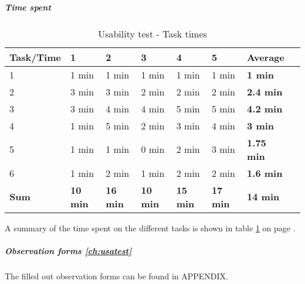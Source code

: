 \subparagraph{Time spent}\hfill
\newline
\begin{table}[h!]
\begin{center}
\begin{tabular}{l|l|l|l|l|l|l|l}	\hline
\textbf{Task/Time}&\textbf{1}&\textbf{2}&\textbf{3}&\textbf{4}&\textbf{5}&\textbf{Average}\\ \hline \hline
				1&1 min&1 min&1 min&1 min&1 min&\textbf{1 min}\\ \hline
				2&3 min&3 min&2 min&2 min&2 min&\textbf{2.4 min}\\ \hline
				3&3 min&4 min&4 min&5 min&5 min&\textbf{4.2 min}\\ \hline
				4&1 min&5 min&2 min&3 min&4 min&\textbf{3 min}\\ \hline
				5&1 min&1 min&0 min&2 min&3 min&\textbf{1.75 min}\\ \hline
				6&1 min&2 min&1 min&2 min&2 min&\textbf{1.6 min}\\ \hline
				\textbf{Sum}&\textbf{10 min}&\textbf{16 min}&\textbf{10 min}&\textbf{15 min}&\textbf{17 min}&\textbf{14 min}\\ \hline 
				
\end{tabular}
\end{center}
\caption{Usability test - Task times} \label{tab:usabilitytasktime}
\end{table}

A summary of the time spent on the different tasks is shown in table \ref{tab:usabilitytasktime} on page \pageref{tab:usabilitytasktime}.
			\subparagraph{Observation forms \ref{ch:usatest}}\hfill
\newline
The filled out observation forms can be found in APPENDIX. 

\newpage

